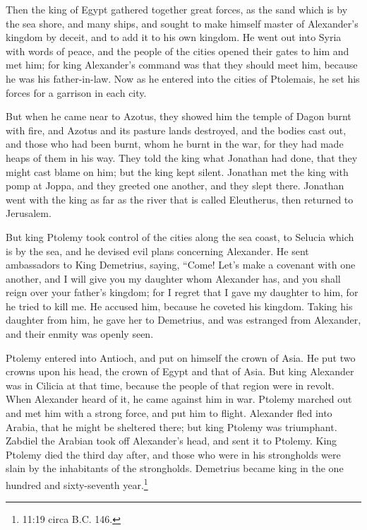  Then the king of Egypt gathered together great forces, as
the sand which is by the sea shore, and many ships, and sought to make
himself master of Alexander's kingdom by deceit, and to add it to his
own kingdom.  He went out into Syria with words of peace,
and the people of the cities opened their gates to him and met him; for
king Alexander's command was that they should meet him, because he was
his father-in-law.  Now as he entered into the cities of
Ptolemais, he set his forces for a garrison in each city.

 But when he came near to Azotus, they showed him the temple
of Dagon burnt with fire, and Azotus and its pasture lands destroyed,
and the bodies cast out, and those who had been burnt, whom he burnt in
the war, for they had made heaps of them in his way.  They
told the king what Jonathan had done, that they might cast blame on him;
but the king kept silent.  Jonathan met the king with pomp
at Joppa, and they greeted one another, and they slept there.
 Jonathan went with the king as far as the river that is
called Eleutherus, then returned to Jerusalem.

 But king Ptolemy took control of the cities along the sea
coast, to Selucia which is by the sea, and he devised evil plans
concerning Alexander.  He sent ambassadors to King
Demetrius, saying, ``Come! Let's make a covenant with one another, and I
will give you my daughter whom Alexander has, and you shall reign over
your father's kingdom;  for I regret that I gave my
daughter to him, for he tried to kill me.  He accused him,
because he coveted his kingdom.  Taking his daughter from
him, he gave her to Demetrius, and was estranged from Alexander, and
their enmity was openly seen.

 Ptolemy entered into Antioch, and put on himself the crown
of Asia. He put two crowns upon his head, the crown of Egypt and that of
Asia.  But king Alexander was in Cilicia at that time,
because the people of that region were in revolt.  When
Alexander heard of it, he came against him in war. Ptolemy marched out
and met him with a strong force, and put him to flight. 
Alexander fled into Arabia, that he might be sheltered there; but king
Ptolemy was triumphant.  Zabdiel the Arabian took off
Alexander's head, and sent it to Ptolemy.  King Ptolemy
died the third day after, and those who were in his strongholds were
slain by the inhabitants of the strongholds.  Demetrius
became king in the one hundred and sixty-seventh year.\footnote{11:19
  circa B.C. 146.}

